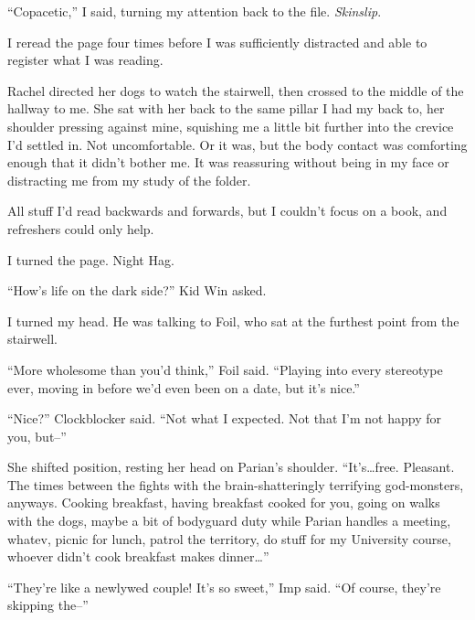 ``Copacetic,'' I said, turning my attention back to the file.  \emph{Skinslip}.



I reread the page four times before I was sufficiently distracted and able to register what I was reading.



Rachel directed her dogs to watch the stairwell, then crossed to the middle of the hallway to me.  She sat with her back to the same pillar I had my back to, her shoulder pressing against mine, squishing me a little bit further into the crevice I'd settled in.  Not uncomfortable.  Or it was, but the body contact was comforting enough that it didn't bother me.  It was reassuring without being in my face or distracting me from my study of the folder.



All stuff I'd read backwards and forwards, but I couldn't focus on a book, and refreshers could only help.



I turned the page.  Night Hag.



``How's life on the dark side?'' Kid Win asked.



I turned my head.  He was talking to Foil, who sat at the furthest point from the stairwell.



``More wholesome than you'd think,'' Foil said.  ``Playing into every stereotype ever, moving in before we'd even been on a date, but it's nice.''



``Nice?'' Clockblocker said.  ``Not what I expected.  Not that I'm not happy for you, but--''



She shifted position, resting her head on Parian's shoulder.  ``It's\ldots free.  Pleasant.  The times between the fights with the brain-shatteringly terrifying god-monsters, anyways.  Cooking breakfast, having breakfast cooked for you, going on walks with the dogs, maybe a bit of bodyguard duty while Parian handles a meeting, whatev, picnic for lunch, patrol the territory, do stuff for my University course, whoever didn't cook breakfast makes dinner\ldots''



``They're like a newlywed couple!  It's so sweet,'' Imp said.  ``Of course, they're skipping the--''



